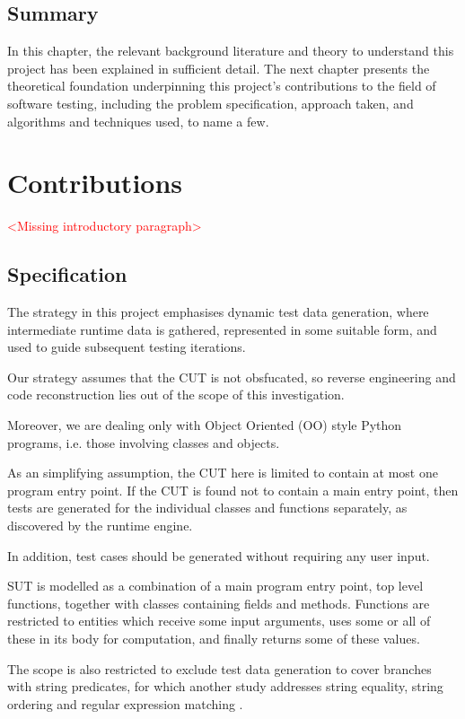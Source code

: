 \documentclass{icldt}
\numberwithin{equation}{section}       %
\begin{document}
{\section{Summary}
In this chapter, the relevant background literature and theory to understand this project has been explained in sufficient detail. The next chapter presents the theoretical foundation underpinning this project's contributions to the field of software testing, including the problem specification, approach taken, and algorithms and techniques used, to name a few.
\chapter{Contributions}
\label{ch:contrib}
\textcolor{red}{<Missing introductory paragraph>}
\section{Specification}
The strategy in this project emphasises dynamic test data generation, where intermediate runtime data is gathered, represented in some suitable form, and used to guide subsequent testing iterations.

Our strategy assumes that the CUT is not obsfucated, so reverse engineering and code reconstruction lies out of the scope of this investigation.

Moreover, we are dealing only with Object Oriented (OO) style Python programs, i.e. those involving classes and objects.

As an simplifying assumption, the CUT here is limited to contain at most one program entry point. If the CUT is found not to contain a main entry point, then tests are generated for the individual classes and functions separately, as discovered by the runtime engine.

In addition, test cases should be generated without requiring any user input.

SUT is modelled as a combination of a main program entry point, top level functions, together with classes containing fields and methods. Functions are restricted to entities which receive some input arguments, uses some or all of these in its body for computation, and finally returns some of these values.

The scope is also restricted to exclude test data generation to cover branches with string predicates, for which another study addresses string equality, string ordering and regular expression matching \cite{Alshraideh2006}.

}
\end{document}
